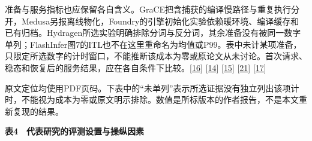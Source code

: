 \documentclass[
  11pt,
  UTF8]{ctexart}
\begin{document}
准备与服务指标也应保留各自含义。GraCE把含捕获的编译慢路径与重复执行分开，Medusa另报离线物化，Foundry的引擎初始化实验依赖暖环境、编译缓存和已有归档。Hydragen所选实验明确排除分词与反分词，其余准备没有被同一数字单列；FlashInfer图7的ITL也不在这里重命名为均值或P99。表中未计某项准备，只限定所选数字的计时窗口，不能推断该成本为零或原论文从未讨论。首次请求、稳态和恢复后的服务结果，应在各自条件下比较。{[}\protect\hyperlink{ref-ghosh2026grace}{16}{]}
{[}\protect\hyperlink{ref-zeng2025medusa}{14}{]}
{[}\protect\hyperlink{ref-liu2026foundry}{15}{]}
{[}\protect\hyperlink{ref-juravsky2024hydragen}{21}{]}
{[}\protect\hyperlink{ref-ye2025flashinfer}{17}{]}

原文定位均使用PDF页码。下表中的``未单列''表示所选证据没有独立列出该项计时，不能视为成本为零或原文明示排除。数值是所标版本的作者报告，不是本文重新复现的结果。

\textbf{表4　代表研究的评测设置与操纵因素}
\end{document}
